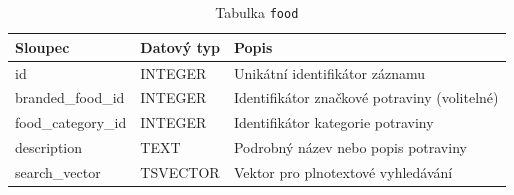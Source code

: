 \begin{table}[ht!]
    \centering
    \begin{tabularx}{\textwidth}{|l|l|L|}
        \hline
        \textbf{Sloupec}   & \textbf{Datový typ} & \textbf{Popis}                               \\ \hline
        id                 & INTEGER             & Unikátní identifikátor záznamu               \\ \hline
        branded\_food\_id  & INTEGER             & Identifikátor značkové potraviny (volitelné) \\ \hline
        food\_category\_id & INTEGER             & Identifikátor kategorie potraviny            \\ \hline
        description        & TEXT                & Podrobný název nebo popis potraviny          \\ \hline
        search\_vector     & TSVECTOR            & Vektor pro plnotextové vyhledávání           \\ \hline
    \end{tabularx}
    \caption{Tabulka \texttt{food}}
    \label{tab:food}
\end{table}
